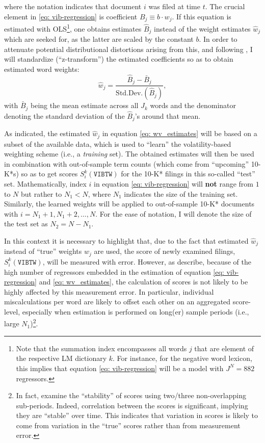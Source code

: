 where the notation indicates that document $i$ was filed at time $t$. The crucial element in \eqref{eq: vib-regression} is coefficient $B_j \equiv b \cdot w_j$. If this equation is estimated with OLS\footnote{Note that the summation index encompasses all words $j$ that are element of the respective LM dictionary $k$. For instance, for the negative word lexicon, this implies that equation \eqref{eq: vib-regression} will be a model with $J^N = 882$ regressors.}, one obtains estimates $\hat{B}_{j}$ instead of the weight estimates $\hat{w}_{j}$ which are seeked for, as the latter are scaled by the constant $b$. In order to attenuate potential distributional distortions arising from this, and following \textcite{Jegadeesh2013}, I will standardize (\enquote{z-transform}) the estimated coefficients so as to obtain estimated word weights:
\begin{equation} \label{eq: wv_estimates}
\hat{w}_{j} = \dfrac{\hat{B}_{j} - \bar{B}_{j}}{\text{Std.Dev.}(\hat{B}_{j})}, 
\end{equation}
with $\bar{B}_{j}$ being the mean estimate across all $J_k$ words and the denominator denoting the standard deviation of the $\hat{B}_{j}$'s around that mean. 

As indicated, the estimated $\hat{w}_{j}$ in equation \eqref{eq: wv_estimates} will be based on a subset of the available data, which is used to \enquote{learn} the volatility-based weighting scheme (i.e., a \textit{training} set). The obtained estimates will then be used in combination with out-of-sample term counts (which come from \enquote{upcoming} 10-K*s) so as to get scores $S_i^k(\texttt{VIBTW})$ for the 10-K* filings in this so-called \enquote{test} set. Mathematically, index $i$ in equation \eqref{eq: vib-regression} will \textbf{not} range from $1$ to $N$ but rather to $N_{1} < N$, where $N_1$ indicates the size of the training set. Similarly, the learned weights will be applied to out-of-sample 10-K* documents with $i = N_1+1, N_1+2, \dots, N$. For the ease of notation, I will denote the size of the test set as $N_2 = N-N_1$. 

In this context it is necessary to highlight that, due to the fact that estimated $\hat{w}_{j}$ instead of \enquote{true} weights ${w}_{j}$ are used, the score of newly examined filings, $S_i^k(\texttt{VIBTW})$, will be measured with error. However, as \textcite{Jegadeesh2013} describe, because of the high number of regressors embedded in the estimation of equation \eqref{eq: vib-regression} and \eqref{eq: wv_estimates}, the calculation of scores is not likely to be highly affected by this measurement error. In particular, individual miscalculations per word are likely to offset each other on an aggregated score-level, especially when estimation is performed on long(er) sample periods (i.e., large $N_1$)\footnote{In fact, \textcite[14, 15, 39]{Jegadeesh2013} examine the \enquote{stability} of scores using two/three non-overlapping sub-periods. Indeed, correlation between the scores is significant, implying they are \enquote{stable} over time. This indicates that variation in scores is likely to come from variation in the \enquote{true} scores rather than from measurement error.}.

